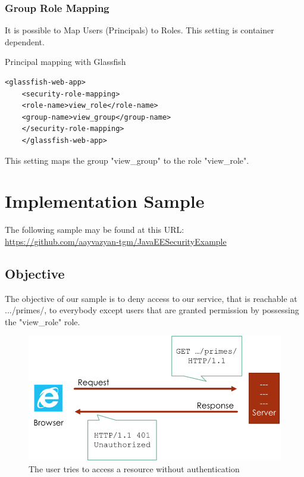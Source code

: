 \documentclass[12pt,a4paper]{report}
\begin{document}
\subsection{Group Role Mapping}
It is possible to Map Users (Principals) to Roles. This setting is container dependent.\\
\begin{bclogo}[couleur=yellow!15,arrondi=0.1,logo=\bccrayon, ombre = true]{Principal mapping with Glassfish}
	\begin{lstlisting}[style=XML]
	<glassfish-web-app>
	<security-role-mapping>
	<role-name>view_role</role-name>
	<group-name>view_group</group-name>
	</security-role-mapping>
	</glassfish-web-app>
	\end{lstlisting}
\end{bclogo}
This setting maps the group "view\_group" to the role "view\_role".

\chapter{Implementation Sample}
The following sample may be found at this URL:\\
\href{https://github.com/aayvazyan-tgm/JavaEESecurityExample}{https://github.com/aayvazyan-tgm/JavaEESecurityExample}\\
\section{Objective}
The objective of our sample is to deny access to our service, that is reachable at .../primes/, to everybody except users that are granted permission by possessing the "view\_role" role.
\begin{figure}[h!]
\centering
\includegraphics[width=1\linewidth]{res/Unauthorized}
\caption{The user tries to access a resource without authentication}
\label{fig:Unauthorized}
\end{figure}
\end{document}
